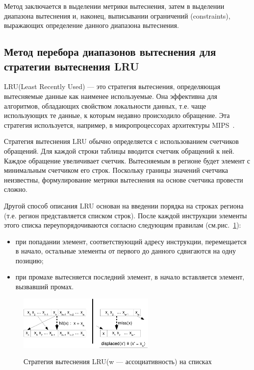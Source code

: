 \documentclass[14pt]{extreport}
\newcommand{\LRU}{\textsf{LRU}\xspace}
\begin{document}
Метод заключается в выделении метрики вытеснения, затем в выделении диапазона
вытеснения и, наконец, выписывании ограничений (constraints), выражающих
определение данного диапазона вытеснения.

\subsection{Метод перебора диапазонов вытеснения для стратегии
вытеснения \LRU}\label{sec:LRU_constraints}

\LRU (Least Recently Used) --- это стратегия вытеснения,
определяющая вытесняемые данные как наименее используемые. Она
эффективна для алгоритмов, обладающих свойством локальности данных,
т.е. чаще использующих те данные, к которым недавно происходило
обращение. Эта стратегия используется, например, в микропроцессорах
архитектуры MIPS~\cite{mips64_II}.

Стратегия вытеснения \LRU обычно определяется с использованием
счетчиков обращений. Для каждой строки таблицы
вводится счетчик обращений к ней. Каждое обращение увеличивает
счетчик. Вытесняемым в регионе будет элемент с минимальным счетчиком его строк.
Поскольку границы значений счетчика неизвестны, формулирование
метрики вытеснения на основе счетчика провести сложно.

Другой способ описания \LRU основан на введении порядка на строках региона (т.е.
регион представляется списком строк). После каждой
инструкции элементы этого списка переупорядочиваются согласно следующим правилам
(см.рис.~\ref{fig:lru1}):
\begin{itemize}
\item при попадании элемент, соответствующий адресу инструкции,
перемещается в начало, остальные элементы от первого до данного
сдвигаются на одну позицию;
\item при промахе вытесняется последний элемент, в начало
вставляется элемент, вызвавший промах.
\end{itemize}

\begin{figure}[h] \center
  \includegraphics[width=0.6\textwidth]{2.theor/lru1}\\
  \caption{Стратегия вытеснения \LRU (w --- ассоциативность) на
списках}\label{fig:lru1}
\end{figure}
\end{document}
